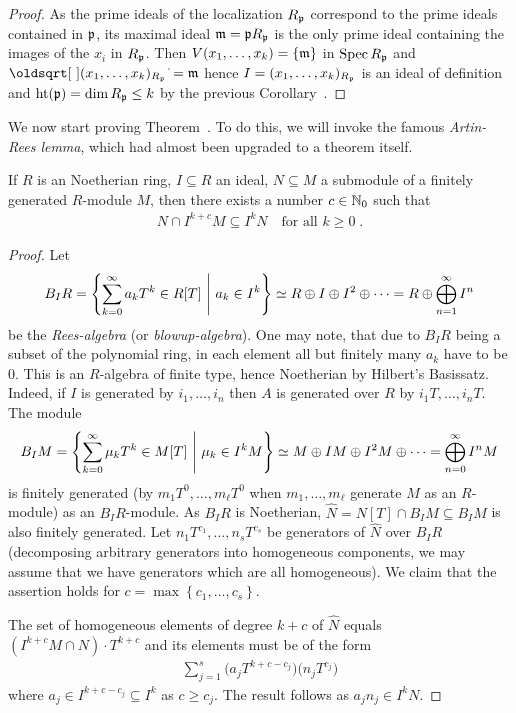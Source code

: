 \documentclass[a4paper,parskip=half,numbers=enddot, DIV=12]{scrreprt}
\begin{document}
\begin{proof}
    As the prime ideals of the localization $R_{\mathfrak{p}}$ correspond to the prime ideals contained in $\mathfrak{p}$, its maximal ideal $\mathfrak{m}=\mathfrak{p} R_{\mathfrak{p}}$ is the only prime ideal containing the images of the $x_i$ in $R_{\mathfrak{p}}$. Then $V(x_1,\ldots, x_k) =\{\mathfrak{m}\}$ in $\operatorname{Spec} R_{\mathfrak{p}}$ and $\sqrt{(x_1,\ldots,x_k)_{R_\pp}}=\mm$ hence $I=(x_1,\ldots, x_k)_{R_{\mathfrak{p}}}$ is an ideal of definition and $\operatorname{ht}(\mathfrak{p})=\dim R_{\mathfrak{p}} \leq k$ by the previous Corollary~.
\end{proof}
We now start proving Theorem~. To do this, we will invoke the famous \emph{Artin-Rees lemma}, which had almost been upgraded to a theorem itself.
\begin{prop} 
    If $R$ is an Noetherian ring, $I\subseteq R$ an ideal, $N\subseteq M$ a submodule of a finitely generated $R$-module $M$, then there exists a number $c\in\mathbb{N}_0$ such that 
    \begin{align*}
    	N\cap I^{k+c}M \subseteq I^kN\quad\text{for all }k\geq 0\;. 
    \end{align*}
\end{prop}
\begin{proof}
    Let 
    \begin{align*}
        B_IR = \left\{\sum_{k=0}^\infty a_kT^k\in R[T] \ \middle|\  a_k\in I^k\right\}\simeq R\oplus I\oplus I^2\oplus\cdots= R\oplus\bigoplus_{n=1}^\infty I^n
    \end{align*}
    be the \emph{Rees-algebra} (or \emph{blowup-algebra}). One may note, that due to $B_IR$ being a subset of the polynomial ring, in each element all but finitely many $a_k$ have to be $0$. This is an $R$-algebra of finite type, hence Noetherian by Hilbert's Basissatz. Indeed, if $I$ is generated by $i_1,\ldots,i_n$ then $A$ is generated over $R$ by $i_1T,\ldots,i_nT$. The module 
    \begin{align*}
        B_IM = \left\{\sum_{k=0}^\infty \mu_kT^k\in M[T] \ \middle|\  \mu_k \in I^kM\right\}\simeq M\oplus IM\oplus I^2M\oplus\cdots=\bigoplus_{n=0}^\infty I^nM
    \end{align*}
    is finitely generated (by $m_1T^0,\ldots,m_\ell T^0$ when $m_1,\ldots,m_\ell$ generate $M$ as an $R$-module) as an $B_IR$-module. As $B_IR$ is Noetherian, $\widehat N = N[T]\cap B_IM \subseteq B_IM$ is also finitely generated. Let $n_1T^{c_1},\ldots,n_sT^{c_s}$ be generators of $\widehat N$ over $B_IR$ (decomposing arbitrary generators into homogeneous components, we may assume that we have generators which are all homogeneous). We claim that the assertion holds for $c = \max\left\{c_1,\ldots,c_s\right\}$. 
    
    The set of homogeneous elements of degree $k+c$ of $\widehat N$ equals $(I^{k+c}M\cap N)\cdot T^{k+c}$ and its elements must be of the form
    \begin{align*}
        \sum_{j = 1}^s \big(a_j T^{k+c-c_j}\big)\big(n_j T^{c_j}\big)
    \end{align*}
    where $a_j \in I^{k+c-c_j} \subseteq I^k$ as $c\geq c_j$. The result follows as $a_j n_j \in I^k N$.
\end{proof}
\end{document}
